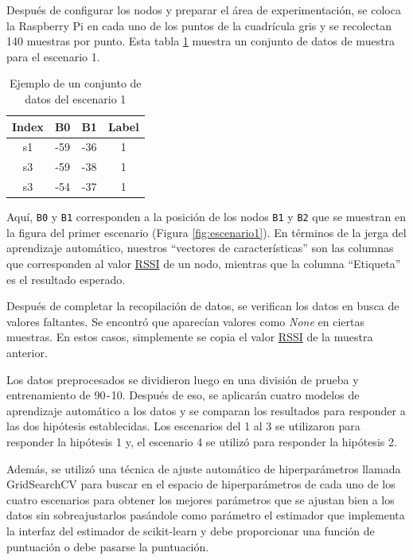 Después de configurar los nodos y preparar el área de experimentación, se coloca la Raspberry Pi en cada uno de los puntos de la cuadrícula gris y se recolectan 140 muestras por punto. Esta tabla \ref{cuadro:tabla1} muestra un conjunto de datos de muestra para el escenario 1.


\begin{table}[H]
\begin{center}
\begin{tabular}{|c|c|c|c|}
\hline
\textbf{Index} & \textbf{B0} & \textbf{B1} & \textbf{Label}  \\
\hline
s1 & -59 & -36 & 1 \\  
s3 & -59 & -38 & 1 \\   
s3 & -54 & -37 & 1 \\   
\hline
\end{tabular}
\caption{Ejemplo de un conjunto de datos del escenario 1}
\label{cuadro:tabla1}
\end{center}
\end{table}


Aquí, \texttt{B0} y \texttt{B1} corresponden a la posición de los nodos \texttt{B1} y \texttt{B2} que se muestran en la figura del primer escenario (Figura \ref{fig:escenario1}). En términos de la jerga del aprendizaje automático, nuestros “vectores de características” son las columnas que corresponden al valor \hyperlink{RSSI}{RSSI} de un nodo, mientras que la columna “Etiqueta” es el resultado esperado.

Después de completar la recopilación de datos, se verifican los datos en busca de valores faltantes. Se encontró que aparecían valores como \textit{None} en ciertas muestras. En estos casos, simplemente se copia el valor \hyperlink{RSSI}{RSSI} de la muestra anterior.

Los datos preprocesados se dividieron luego en una división de prueba y entrenamiento de 90\texttt{-}10. Después de eso, se aplicarán cuatro modelos de aprendizaje automático a los datos y se comparan los resultados para responder a las dos hipótesis establecidas. Los escenarios del 1 al 3 se utilizaron para responder la hipótesis 1 y, el escenario 4 se utilizó para responder la hipótesis 2.

Además, se utilizó una técnica de ajuste automático de hiperparámetros llamada GridSearchCV para buscar en el espacio de hiperparámetros de cada uno de los cuatro escenarios para obtener los mejores parámetros que se ajustan bien a los datos sin sobreajustarlos pasándole como parámetro el estimador que implementa la interfaz del estimador de scikit-learn y debe proporcionar una función de puntuación o debe pasarse la puntuación.

